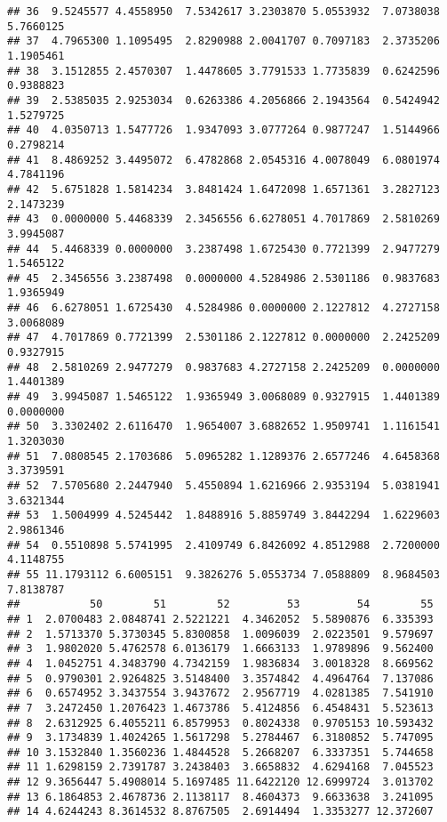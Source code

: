 \documentclass[
]{article}
\begin{document}
\begin{verbatim}
## 36  9.5245577 4.4558950  7.5342617 3.2303870 5.0553932  7.0738038 5.7660125
## 37  4.7965300 1.1095495  2.8290988 2.0041707 0.7097183  2.3735206 1.1905461
## 38  3.1512855 2.4570307  1.4478605 3.7791533 1.7735839  0.6242596 0.9388823
## 39  2.5385035 2.9253034  0.6263386 4.2056866 2.1943564  0.5424942 1.5279725
## 40  4.0350713 1.5477726  1.9347093 3.0777264 0.9877247  1.5144966 0.2798214
## 41  8.4869252 3.4495072  6.4782868 2.0545316 4.0078049  6.0801974 4.7841196
## 42  5.6751828 1.5814234  3.8481424 1.6472098 1.6571361  3.2827123 2.1473239
## 43  0.0000000 5.4468339  2.3456556 6.6278051 4.7017869  2.5810269 3.9945087
## 44  5.4468339 0.0000000  3.2387498 1.6725430 0.7721399  2.9477279 1.5465122
## 45  2.3456556 3.2387498  0.0000000 4.5284986 2.5301186  0.9837683 1.9365949
## 46  6.6278051 1.6725430  4.5284986 0.0000000 2.1227812  4.2727158 3.0068089
## 47  4.7017869 0.7721399  2.5301186 2.1227812 0.0000000  2.2425209 0.9327915
## 48  2.5810269 2.9477279  0.9837683 4.2727158 2.2425209  0.0000000 1.4401389
## 49  3.9945087 1.5465122  1.9365949 3.0068089 0.9327915  1.4401389 0.0000000
## 50  3.3302402 2.6116470  1.9654007 3.6882652 1.9509741  1.1161541 1.3203030
## 51  7.0808545 2.1703686  5.0965282 1.1289376 2.6577246  4.6458368 3.3739591
## 52  7.5705680 2.2447940  5.4550894 1.6216966 2.9353194  5.0381941 3.6321344
## 53  1.5004999 4.5245442  1.8488916 5.8859749 3.8442294  1.6229603 2.9861346
## 54  0.5510898 5.5741995  2.4109749 6.8426092 4.8512988  2.7200000 4.1148755
## 55 11.1793112 6.6005151  9.3826276 5.0553734 7.0588809  8.9684503 7.8138787
##           50        51        52         53         54        55
## 1  2.0700483 2.0848741 2.5221221  4.3462052  5.5890876  6.335393
## 2  1.5713370 5.3730345 5.8300858  1.0096039  2.0223501  9.579697
## 3  1.9802020 5.4762578 6.0136179  1.6663133  1.9789896  9.562400
## 4  1.0452751 4.3483790 4.7342159  1.9836834  3.0018328  8.669562
## 5  0.9790301 2.9264825 3.5148400  3.3574842  4.4964764  7.137086
## 6  0.6574952 3.3437554 3.9437672  2.9567719  4.0281385  7.541910
## 7  3.2472450 1.2076423 1.4673786  5.4124856  6.4548431  5.523613
## 8  2.6312925 6.4055211 6.8579953  0.8024338  0.9705153 10.593432
## 9  3.1734839 1.4024265 1.5617298  5.2784467  6.3180852  5.747095
## 10 3.1532840 1.3560236 1.4844528  5.2668207  6.3337351  5.744658
## 11 1.6298159 2.7391787 3.2438403  3.6658832  4.6294168  7.045523
## 12 9.3656447 5.4908014 5.1697485 11.6422120 12.6999724  3.013702
## 13 6.1864853 2.4678736 2.1138117  8.4604373  9.6633638  3.241095
## 14 4.6244243 8.3614532 8.8767505  2.6914494  1.3353277 12.372607

\end{verbatim}
\end{document}
